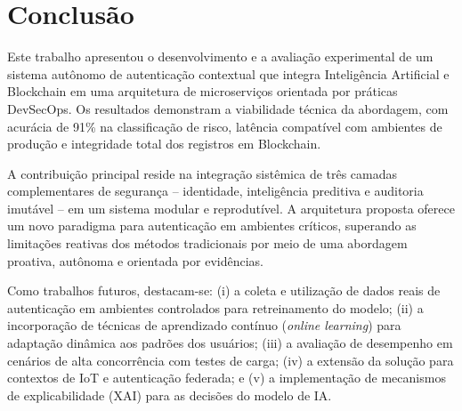 \documentclass[12pt,a4paper]{article}
\begin{document}
\section{Conclusão}

Este trabalho apresentou o desenvolvimento e a avaliação experimental de um sistema autônomo de autenticação contextual que integra Inteligência Artificial e Blockchain em uma arquitetura de microserviços orientada por práticas DevSecOps. Os resultados demonstram a viabilidade técnica da abordagem, com acurácia de 91\% na classificação de risco, latência compatível com ambientes de produção e integridade total dos registros em Blockchain.

A contribuição principal reside na integração sistêmica de três camadas complementares de segurança -- identidade, inteligência preditiva e auditoria imutável -- em um sistema modular e reprodutível. A arquitetura proposta oferece um novo paradigma para autenticação em ambientes críticos, superando as limitações reativas dos métodos tradicionais por meio de uma abordagem proativa, autônoma e orientada por evidências.

Como trabalhos futuros, destacam-se: (i) a coleta e utilização de dados reais de autenticação em ambientes controlados para retreinamento do modelo; (ii) a incorporação de técnicas de aprendizado contínuo (\textit{online learning}) para adaptação dinâmica aos padrões dos usuários; (iii) a avaliação de desempenho em cenários de alta concorrência com testes de carga; (iv) a extensão da solução para contextos de IoT e autenticação federada; e (v) a implementação de mecanismos de explicabilidade (XAI) para as decisões do modelo de IA.


\end{document}
